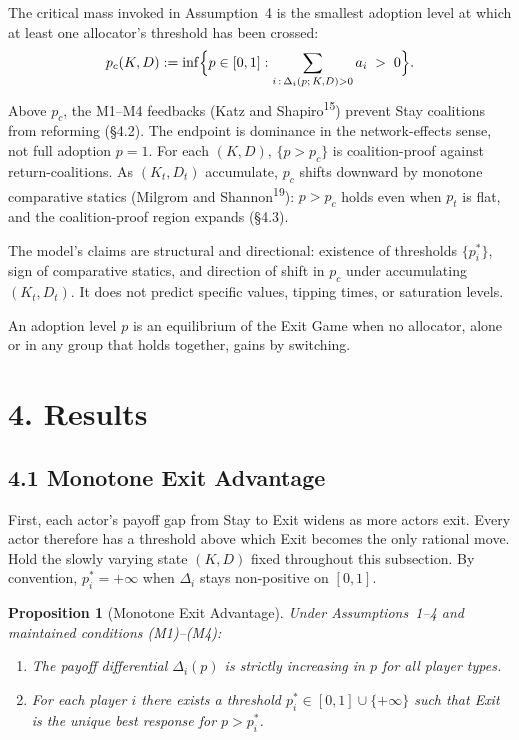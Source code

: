 \documentclass[12pt]{article}
\newtheorem{proposition}{Proposition}
\theoremstyle{definition}
\theoremstyle{remark}
\begin{document}
The critical mass invoked in Assumption~4 is the smallest adoption level at which at least one allocator's threshold has been crossed:
\[
p_c(K, D) := \inf\Bigl\{ p \in [0, 1] : \sum_{i\,:\,\Delta_i(p;\,K,D) > 0} a_i \;>\; 0 \Bigr\}.
\]
Above $p_c$, the M1--M4 feedbacks (Katz and Shapiro\textsuperscript{15}) prevent Stay coalitions from reforming (\S4.2). The endpoint is dominance in the network-effects sense, not full adoption $p = 1$. For each $(K, D)$, $\{p > p_c\}$ is coalition-proof against return-coalitions. As $(K_t, D_t)$ accumulate, $p_c$ shifts downward by monotone comparative statics (Milgrom and Shannon\textsuperscript{19}): $p > p_c$ holds even when $p_t$ is flat, and the coalition-proof region expands (\S4.3).

The model's claims are structural and directional: existence
of thresholds $\{p_i^*\}$, sign of comparative statics, and
direction of shift in $p_c$ under accumulating $(K_t, D_t)$.
It does not predict specific values, tipping times, or
saturation levels.

An adoption level $p$ is an equilibrium of the Exit Game when
no allocator, alone or in any group that holds together, gains
by switching.



\section{4. Results}

\subsection{4.1 Monotone Exit Advantage}

First, each actor's payoff gap from Stay to Exit widens as more actors exit. Every actor therefore has a threshold above which Exit becomes the only rational move. Hold the slowly varying state $(K, D)$ fixed throughout this subsection. By convention, $p_i^* = +\infty$ when $\Delta_i$ stays non-positive on $[0, 1]$.

\begin{proposition}[Monotone Exit Advantage]
Under Assumptions~1--4 and maintained conditions (M1)--(M4):

\begin{enumerate}[label=(\roman*)]
\item The payoff differential $\Delta_i(p)$ is strictly increasing
in $p$ for all player types.
\item For each player $i$ there exists a threshold
$p_i^* \in [0, 1] \cup \{+\infty\}$ such that Exit is the unique
best response for $p > p_i^*$.
\end{enumerate}
\end{proposition}
\end{document}
